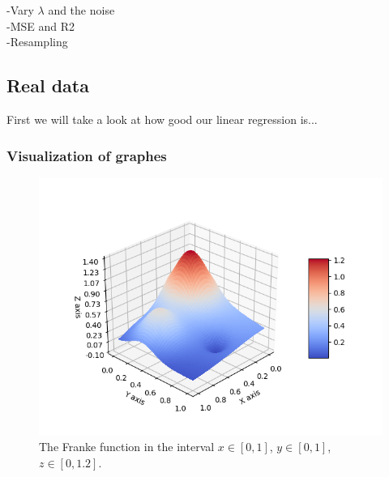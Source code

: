 -Vary $\lambda$ and the noise\\
-MSE and R2\\
-Resampling



\subsection{Real data}
First we will take a look at how good our linear regression is...
\subsubsection{Visualization of graphes}

 \begin{figure} [H]
 	\centering
 	\includegraphics[scale=0.8]{../plots/franke.png}
 	\caption{The Franke function in the interval $x\in[0,1]$, $y\in[0,1]$, $z\in[0, 1.2]$.}
 	\label{fig:franke2}
 \end{figure}

